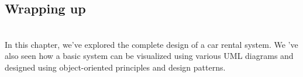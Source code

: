 \subsection{Wrapping up}\label{_FM1DBRLxFVNgQAcR3p2f-2}
\\
In this chapter, we've explored the complete design of a car rental system. We 've also seen how a basic system can be visualized using various UML diagrams and designed using object-oriented principles and design patterns.

